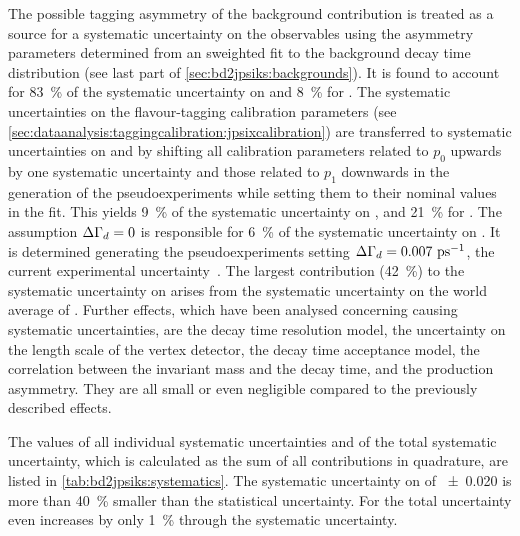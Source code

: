 The possible tagging asymmetry of the background contribution is treated as a
source for a systematic uncertainty on the \CP observables using the asymmetry
parameters determined from an sweighted fit to the background decay time
distribution (see last part of \cref{sec:bd2jpsiks:backgrounds}). It is found
to account for \SI{83}{\percent} of the systematic uncertainty on \SJpsiKS and
\SI{8}{\percent} for \CJpsiKS. The systematic uncertainties on the
flavour-tagging calibration parameters (see
\cref{sec:dataanalysis:taggingcalibration:jpsixcalibration}) are transferred
to systematic uncertainties on \SJpsiKS and \CJpsiKS by shifting all
calibration parameters related to $p_0$ upwards by one systematic uncertainty
and those related to $p_1$ downwards in the generation of the
pseudoexperiments while setting them to their nominal values in the fit. This
yields \SI{9}{\percent} of the systematic uncertainty on \SJpsiKS, and
\SI{21}{\percent} for \CJpsiKS. The assumption ${\Delta\Gamma_{{d}}} = 0$ is responsible for
\SI{6}{\percent} of the systematic uncertainty on \SJpsiKS. It is determined
generating the pseudoexperiments setting ${\Delta\Gamma_{{d}}} = \SI{0.007}{\ensuremath{{\mathrm{ \,ps^{-1}}}}}$, the
current experimental uncertainty~\cite{PDG2014}. The largest contribution
(\SI{42}{\percent}) to the systematic uncertainty on \CJpsiKS arises from the
systematic uncertainty on the world average of \dmd. Further effects, which
have been analysed concerning causing systematic uncertainties, are the decay
time resolution model, the uncertainty on the length scale of the vertex
detector, the decay time acceptance model, the correlation between the
invariant mass and the decay time, and the production asymmetry. They are all
small or even negligible compared to the previously described effects.

The values of all individual systematic uncertainties and of the total
systematic uncertainty, which is calculated as the sum of all contributions in
quadrature, are listed in \cref{tab:bd2jpsiks:systematics}. The systematic
uncertainty on \SJpsiKS of \num{\pm0.020} is more than \SI{40}{\percent}
smaller than the statistical uncertainty. For \CJpsiKS the total uncertainty
even increases by only \SI{1}{\percent} through the systematic uncertainty.

